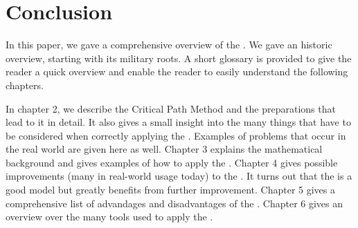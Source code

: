 \section{Conclusion}\label{sec:conclusion}
In this paper, we gave a comprehensive overview of the \cpm{}. We gave an
historic overview, starting with its military roots. A short glossary is
provided to give the reader a quick overview and enable the reader to easily
understand the following chapters.

In chapter 2, we describe the Critical Path Method and the preparations that lead to it in
detail. It also gives a small insight into the many things that have to be
considered when correctly applying the \cpm{}. Examples of problems that occur in
the real world are given here as well. Chapter 3 explains the mathematical
background and gives examples of how to apply the \cpm{}. Chapter 4 gives
possible improvements (many in real-world usage today) to the \cpm{}. It turns
out that the \cpm{} is a good model but greatly benefits from further
improvement. Chapter 5 gives a comprehensive list of advandages and
disadvantages of the \cpm{}. Chapter 6 gives an overview over the many tools
used to apply the \cpm{}.
